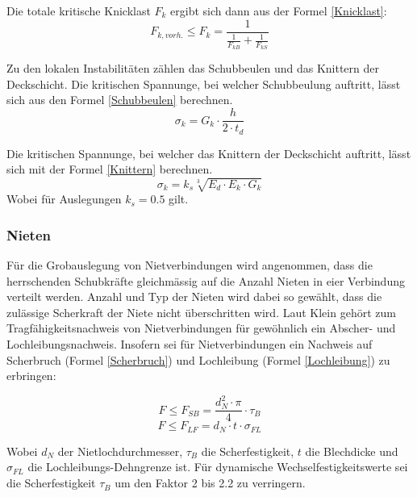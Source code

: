     Die totale kritische Knicklast \(F_k\) ergibt sich dann aus der Formel \ref{Knicklast}:
    \begin{equation}
      \label{Knicklast}
      F_{k, vorh.} \leq F_k=\frac{1}{\frac{1}{F_{kB}}+\frac{1}{F_{kS}}}
    \end{equation}

    Zu den lokalen Instabilitäten zählen das Schubbeulen und das Knittern der Deckschicht. Die kritischen Spannunge, bei welcher Schubbeulung auftritt, lässt sich aus den Formel \ref{Schubbeulen} berechnen. \cite{ETH}
    \begin{equation}
      \label{Schubbeulen}
      \sigma_k = G_k \cdot \frac{h}{2 \cdot t_d}
    \end{equation}

    Die kritischen Spannunge, bei welcher das Knittern der Deckschicht auftritt, lässt sich mit der Formel \ref{Knittern} berechnen. \cite{ETH}
    \begin{equation}
      \label{Knittern}
      \sigma_k = k_s\sqrt[3]{E_d \cdot E_k \cdot G_k}
    \end{equation}
    Wobei für Auslegungen \(k_s = 0.5\) gilt.


  \subsubsection{Nieten}
    Für die Grobauslegung von Nietverbindungen wird angenommen, dass die herrschenden Schubkräfte gleichmässig auf die Anzahl Nieten in eier Verbindung verteilt werden. Anzahl und Typ der Nieten wird dabei so gewählt, dass die zulässige Scherkraft der Niete nicht überschritten wird. Laut Klein \cite{klein} gehört zum Tragfähigkeitsnachweis von Nietverbindungen für gewöhnlich ein Abscher- und Lochleibungsnachweis. Insofern sei für Nietverbindungen ein Nachweis auf Scherbruch (Formel \ref{Scherbruch}) und Lochleibung (Formel \ref{Lochleibung}) zu erbringen:
    \begin{multicols}{2}
      \begin{equation}
        \label{Scherbruch}
        F \leq F_{SB} = \frac{d_N^2 \cdot \pi}{4}\cdot \tau_B
      \end{equation}\break
      \begin{equation}
        \label{Lochleibung}
        F \leq F_{LF} = d_N \cdot t \cdot \sigma_{FL}
      \end{equation}
    \end{multicols}
    Wobei $d_N$ der Nietlochdurchmesser, $\tau_B$ die Scherfestigkeit, $t$ die Blechdicke und $\sigma_{FL}$ die Lochleibungs-Dehngrenze ist. Für dynamische Wechselfestigkeitswerte sei die Scherfestigkeit $\tau_B$ um den Faktor 2 bis 2.2 zu verringern.

